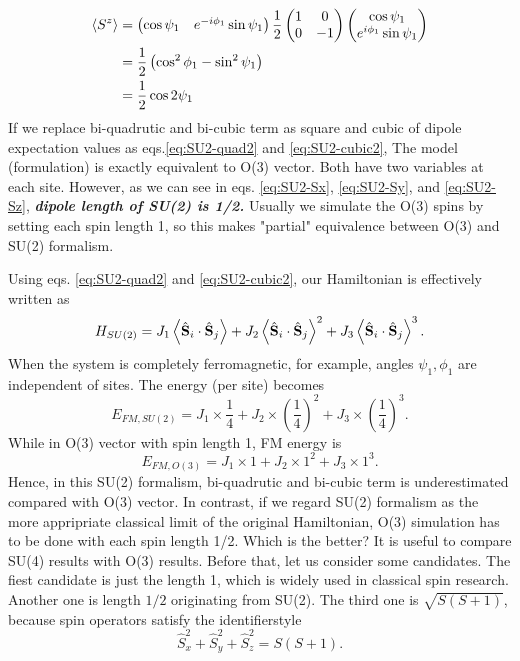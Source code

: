\documentclass[11pt, aps, longbibliography]{article}
\begin{document}
\begin{align}
    \expval{S^z} &= \begin{pmatrix}\cos \psi_1 & e^{-i\phi_1}\sin \psi_1\end{pmatrix}\frac{1}{2}\begin{pmatrix}1 & 0 \\ 0 & -1 \end{pmatrix} \begin{pmatrix}\cos \psi_1 \\ e^{i\phi_1}\sin \psi_1\end{pmatrix} \\
    &= \frac{1}{2} \left(\cos^2 \phi_1 - \sin^2 \psi_1 \right) \\
    &= \frac{1}{2} \cos 2\psi_1 \label{eq:SU2-Sz}
\end{align}
If we replace bi-quadrutic and bi-cubic term as square and cubic of dipole expectation values as eqs.\eqref{eq:SU2-quad2} and \eqref{eq:SU2-cubic2},
The model (formulation) is exactly equivalent to O(3) vector. Both have two variables at each site. However, as we can see in eqs. \eqref{eq:SU2-Sx}, \eqref{eq:SU2-Sy}, and \eqref{eq:SU2-Sz}, \textbf{\emph{dipole length of SU(2) is 1/2.}}
Usually we simulate the O(3) spins by setting each spin length 1, so this makes "partial" equivalence between O(3) and SU(2) formalism.

Using eqs. \eqref{eq:SU2-quad2} and \eqref{eq:SU2-cubic2}, our Hamiltonian is effectively written as
\begin{equation}
    H_{SU(2)} = J_{1}\expval{\hat{\bold{S}}_{i}\cdot \hat{\bold{S}}_{j}} + J_2 \expval{\hat{\bold{S}}_{i}\cdot \hat{\bold{S}}_{j}}^2 + J_3 \expval{\hat{\bold{S}}_{i}\cdot \hat{\bold{S}}_{j}}^3.
\end{equation}
When the system is completely ferromagnetic, for example, angles $\psi_1, \phi_1$ are independent of sites. The energy (per site) becomes
\begin{equation}
    E_{FM,SU(2)} = J_1 \times \frac{1}{4} + J_2 \times \left(\frac{1}{4}\right)^2 + J_3 \times \left(\frac{1}{4}\right)^3.
\end{equation}
While in O(3) vector with spin length 1, FM energy is
\begin{equation}
    E_{FM,O(3)} = J_1 \times 1 + J_2 \times 1^2 + J_3 \times 1^3.
\end{equation}
Hence, in this SU(2) formalism, bi-quadrutic and bi-cubic term is underestimated compared with O(3) vector. 
In contrast, if we regard SU(2) formalism as the more appripriate classical limit of the original Hamiltonian, O(3) simulation has to be done with each spin length 1/2.
Which is the better? It is useful to compare SU(4) results with O(3) results. Before that, let us consider some candidates.
The fiest candidate is just the length 1, which is widely used in classical spin research. Another one is length $1/2$ originating from SU(2).
The third one is $\sqrt{S(S+1)}$, because spin operators satisfy the identifierstyle
\begin{equation}
    \hat{S}_x^2 + \hat{S}_y^2 + \hat{S}_z^2 = S(S+1).
\end{equation}
\end{document}
